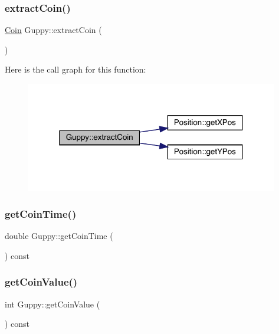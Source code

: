 \subsubsection{\texorpdfstring{extract\+Coin()}{extractCoin()}}
{\footnotesize\ttfamily \mbox{\hyperlink{class_coin}{Coin}} Guppy\+::extract\+Coin (\begin{DoxyParamCaption}{ }\end{DoxyParamCaption})}

Here is the call graph for this function\+:
\nopagebreak
\begin{figure}[H]
\begin{center}
\leavevmode
\includegraphics[width=313pt]{class_guppy_ab3fef72b059ac88a3e901af4db113e1d_cgraph}
\end{center}
\end{figure}
\mbox{\label{class_guppy_ae292cfe7a3d33ed860da190b930441b3}} 
\subsubsection{\texorpdfstring{get\+Coin\+Time()}{getCoinTime()}}
{\footnotesize\ttfamily double Guppy\+::get\+Coin\+Time (\begin{DoxyParamCaption}{ }\end{DoxyParamCaption}) const}

\mbox{\label{class_guppy_ae190cb7bd1cbc2b36c36d99cd75848e0}} 
\subsubsection{\texorpdfstring{get\+Coin\+Value()}{getCoinValue()}}
{\footnotesize\ttfamily int Guppy\+::get\+Coin\+Value (\begin{DoxyParamCaption}{ }\end{DoxyParamCaption}) const}

